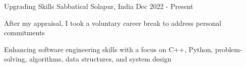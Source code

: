 


\begin{cventries}

\cventry
{Upgrading Skills}
{Sabbatical}
{Solapur, India}
{Dec 2022 - Present}
{
\begin{cvitems}
\item {After my appraisal, I took a voluntary career break to address personal commitments}
\item {Enhancing software engineering skills with a focus on C++, Python, problem-solving, algorithms, data structures, and system design}
\end{cvitems}
}


\end{cventries}
